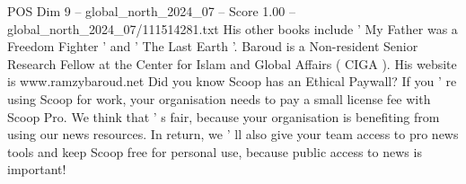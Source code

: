 \begin{textsample}{POS Dim 9 – global\_north\_2024\_07 – Score 1.00 – global\_north\_2024\_07/111514281.txt}
His other books include ' My Father was a Freedom Fighter ' and ' The Last Earth '.
Baroud is a Non-resident Senior Research Fellow at the Center for Islam and Global Affairs ( CIGA ).
His website is www.ramzybaroud.net Did you know Scoop has an Ethical Paywall?
If you ' re using Scoop for work, your organisation needs to pay a small license fee with Scoop Pro.
We think that ' s fair, because your organisation is benefiting from using our news resources.
In return, we ' ll also give your team access to pro news tools and keep Scoop free for personal use, because public access to news is important!

\end{textsample}
